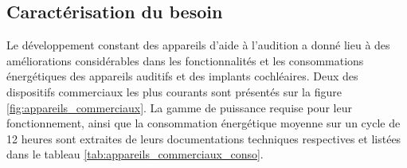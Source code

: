 	\subsection{Caractérisation du besoin}
	\label{subsec:1.3.1_Caracterisation la source d energie}
Le développement constant des appareils d'aide à l'audition a donné lieu à des améliorations considérables dans les fonctionnalités et les consommations énergétiques des appareils auditifs et des implants cochléaires. Deux des dispositifs commerciaux les plus courants sont présentés sur la figure \ref{fig:appareils_commerciaux}. La gamme de puissance requise pour leur fonctionnement, ainsi que la consommation énergétique moyenne sur un cycle de 12 heures sont extraites de leurs documentations techniques respectives et listées dans le tableau \ref{tab:appareils_commerciaux_conso}.
